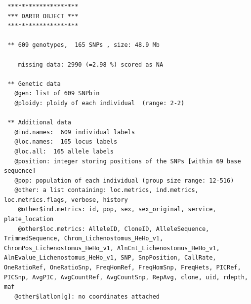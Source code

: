 \documentclass[
  letterpaper,
  DIV=11,
  numbers=noendperiod]{scrreprt}
\newenvironment{Shaded}{\begin{snugshade}}{\end{snugshade}}
\newcommand{\CommentTok}[1]{\textcolor[rgb]{0.38,0.63,0.69}{\textit{#1}}}
\newcommand{\NormalTok}[1]{\textcolor[rgb]{0.00,0.44,0.13}{#1}}
\newcommand{\SpecialCharTok}[1]{\textcolor[rgb]{0.25,0.44,0.63}{#1}}
\begin{document}
\begin{Shaded}
\end{Shaded}

\begin{verbatim}
 ********************
 *** DARTR OBJECT ***
 ********************

 ** 609 genotypes,  165 SNPs , size: 48.9 Mb

    missing data: 2990 (=2.98 %) scored as NA

 ** Genetic data
   @gen: list of 609 SNPbin
   @ploidy: ploidy of each individual  (range: 2-2)

 ** Additional data
   @ind.names:  609 individual labels
   @loc.names:  165 locus labels
   @loc.all:  165 allele labels
   @position: integer storing positions of the SNPs [within 69 base sequence]
   @pop: population of each individual (group size range: 12-516)
   @other: a list containing: loc.metrics, ind.metrics, loc.metrics.flags, verbose, history 
    @other$ind.metrics: id, pop, sex, sex_original, service, plate_location 
    @other$loc.metrics: AlleleID, CloneID, AlleleSequence, TrimmedSequence, Chrom_Lichenostomus_HeHo_v1, ChromPos_Lichenostomus_HeHo_v1, AlnCnt_Lichenostomus_HeHo_v1, AlnEvalue_Lichenostomus_HeHo_v1, SNP, SnpPosition, CallRate, OneRatioRef, OneRatioSnp, FreqHomRef, FreqHomSnp, FreqHets, PICRef, PICSnp, AvgPIC, AvgCountRef, AvgCountSnp, RepAvg, clone, uid, rdepth, maf 
   @other$latlon[g]: no coordinates attached
\end{verbatim}

\begin{Shaded}
\end{Shaded}
\end{document}
